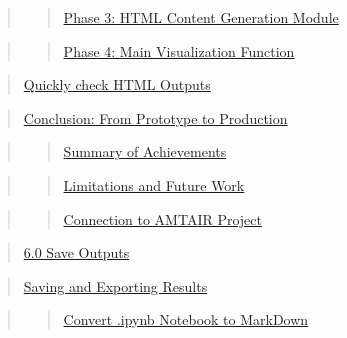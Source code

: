 \documentclass[
  letterpaper,
]{book}
\begin{document}
\begin{quote}
\begin{quote}
\hyperref[scrollTo=gnS3jFGU52OZ]{Phase 3: HTML Content Generation
Module}
\end{quote}
\end{quote}

\begin{quote}
\begin{quote}
\hyperref[scrollTo=d2uyG0Pi571f]{Phase 4: Main Visualization Function}
\end{quote}
\end{quote}

\begin{quote}
\hyperref[scrollTo=bFtxTKmLElSF]{Quickly check HTML Outputs}
\end{quote}

\begin{quote}
\hyperref[scrollTo=oatKYlKrOSiN]{Conclusion: From Prototype to
Production}
\end{quote}

\begin{quote}
\begin{quote}
\hyperref[scrollTo=oatKYlKrOSiN]{Summary of Achievements}
\end{quote}
\end{quote}

\begin{quote}
\begin{quote}
\hyperref[scrollTo=oatKYlKrOSiN]{Limitations and Future Work}
\end{quote}
\end{quote}

\begin{quote}
\begin{quote}
\hyperref[scrollTo=oatKYlKrOSiN]{Connection to AMTAIR Project}
\end{quote}
\end{quote}

\begin{quote}
\hyperref[scrollTo=kjbIj19epbrF]{6.0 Save Outputs}
\end{quote}

\begin{quote}
\hyperref[scrollTo=0QqlN6dYpm4s]{Saving and Exporting Results}
\end{quote}

\begin{quote}
\begin{quote}
\hyperref[scrollTo=pS6AhdiSCLw4]{Convert .ipynb Notebook to MarkDown}
\end{quote}
\end{quote}
\end{document}
